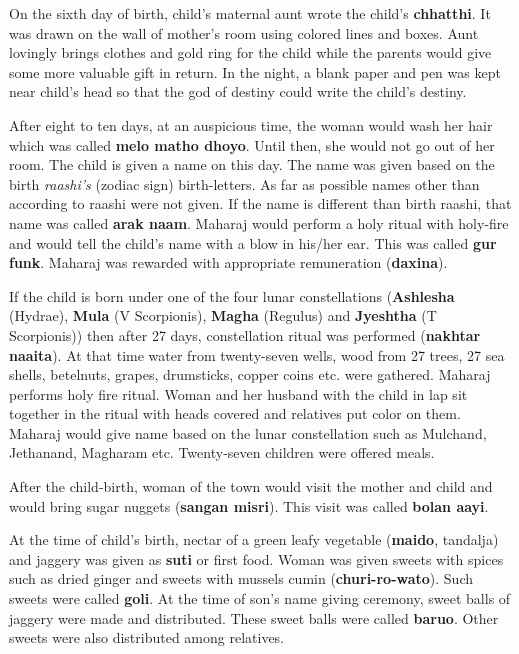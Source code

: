 On the sixth day of birth, child's maternal aunt wrote the child's
\textbf{chhatthi}. It was drawn on the wall of mother's room using colored
lines and boxes. Aunt lovingly brings clothes and gold ring for the
child while the parents would give some more valuable gift in return. In the
night, a blank paper and pen was kept near child's head so that the god of
destiny could write the child's destiny.

After eight to ten days, at an auspicious time, the woman would wash her hair
which was called \textbf{melo matho dhoyo}. Until then, she would not go out of
her room. The child is given a name on this day. The name was given based on
the birth \textit{raashi's} (zodiac sign) birth-letters. As far as possible names other than
according to raashi were not given. If the name is different than birth raashi, 
that name was called \textbf{arak naam}. Maharaj would perform a holy ritual
with holy-fire and would tell the child's name with a blow in his/her ear. This was
called \textbf{gur funk}. Maharaj was rewarded with appropriate remuneration
 (\textbf{daxina}).

If the child is born under one of the four lunar constellations
(\textbf{Ashlesha} (Hydrae), \textbf{Mula} (V Scorpionis),
\textbf{Magha} (Regulus) and \textbf{Jyeshtha} (T Scorpionis)) then after 27
days, constellation ritual was performed (\textbf{nakhtar naaita}). At that
time water from twenty-seven wells, wood from 27 trees, 27 sea shells, betelnuts,
grapes, drumsticks, copper coins etc. were gathered. Maharaj performs holy
fire ritual. Woman and her husband with the child in lap sit together in the
ritual with heads covered and relatives put color on them. Maharaj would give
name based on the lunar constellation such as Mulchand, Jethanand, Magharam
etc. Twenty-seven children were offered meals.

After the child-birth, woman of the town would visit the mother and child and
would bring sugar nuggets (\textbf{sangan misri}). This visit was called
\textbf{bolan aayi}.

At the time of child's birth, nectar of a green leafy vegetable
(\textbf{maido}, tandalja) and jaggery was given as \textbf{suti} or first
food. Woman was given sweets with spices such as dried ginger and sweets with
mussels cumin (\textbf{churi-ro-wato}). Such sweets were called \textbf{goli}.
At the time of son's name giving ceremony, sweet balls of jaggery were made and
distributed. These sweet balls were called \textbf{baruo}. Other sweets were
also distributed among relatives.

